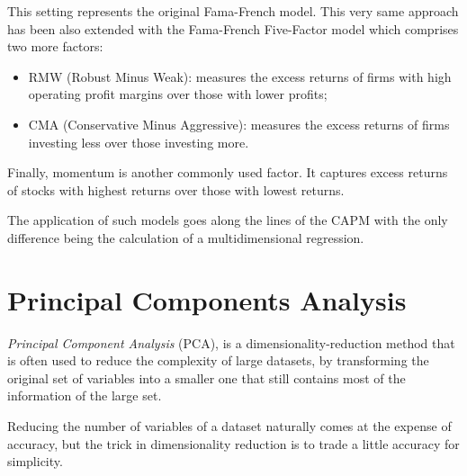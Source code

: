This setting represents the original Fama-French model. This very same approach has been also extended with the Fama-French Five-Factor model which comprises two more factors:
\begin{itemize}
\tightlist
\item RMW (Robust Minus Weak): measures the excess returns of firms with high operating profit margins over those with lower profits;
\item CMA (Conservative Minus Aggressive): measures the excess returns of firms investing less over those investing more.
\end{itemize}
Finally, momentum is another commonly used factor. It captures excess returns of stocks with highest returns over those with lowest returns.

The application of such models goes along the lines of the CAPM with the only difference being the calculation of a multidimensional regression.

%
%
%

\section{Principal Components Analysis}
\label{sec:pca}

\emph{Principal Component Analysis} (PCA), is a dimensionality-reduction method that is often used to reduce the complexity of large datasets, by transforming the original set of variables into a smaller one that still contains most of the information of the large set.

Reducing the number of variables of a dataset naturally comes at the expense of accuracy, but the trick in dimensionality reduction is to trade a little accuracy for simplicity.


